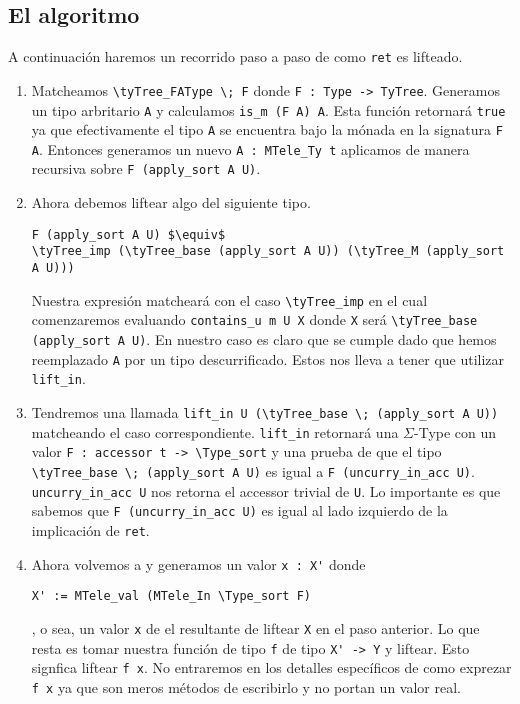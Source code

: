 \subsection{El algoritmo}

A continuación haremos un recorrido paso a paso de como \lstinline{ret} es lifteado.

\begin{enumerate}
    \item Matcheamos \lstinline{\tyTree_FAType \; F} donde \lstinline{F : Type -> TyTree}. Generamos un tipo arbritario \lstinline{A} y calculamos \lstinline{is_m (F A) A}. Esta función retornará \lstinline{true} ya que efectivamente el tipo \lstinline{A} se encuentra bajo la mónada en la signatura \lstinline{F A}. Entonces generamos un nuevo \lstinline{A : MTele_Ty t} aplicamos \lift de manera recursiva sobre \lstinline{F (apply_sort A U)}.
    \item Ahora debemos liftear algo del siguiente tipo.
    \begin{lstlisting}
F (apply_sort A U) $\equiv$
\tyTree_imp (\tyTree_base (apply_sort A U)) (\tyTree_M (apply_sort A U)))
    \end{lstlisting}
    Nuestra expresión matcheará con el caso \lstinline{\tyTree_imp} en el cual comenzaremos evaluando \lstinline{contains_u m U X} donde \lstinline{X} será \lstinline{\tyTree_base (apply_sort A U)}. En nuestro caso es claro que se cumple dado que hemos reemplazado \lstinline{A} por un tipo descurrificado. Estos nos lleva a tener que utilizar \lstinline{lift_in}.
    \item Tendremos una llamada \lstinline{lift_in U (\tyTree_base \; (apply_sort A U))} matcheando el caso correspondiente.
    \lstinline{lift_in} retornará una $\Sigma$-Type con un valor \lstinline{F : accessor t -> \Type_sort} y una prueba de que el tipo \lstinline{\tyTree_base \; (apply_sort A U)} es igual a \lstinline{F (uncurry_in_acc U)}. \lstinline{uncurry_in_acc U} nos retorna el accessor trivial de \lstinline{U}. Lo importante es que sabemos que \lstinline{F (uncurry_in_acc U)} es igual al lado izquierdo de la implicación de \lstinline{ret}.
    \item Ahora volvemos a \lift{} y generamos un valor \lstinline{x : X'} donde
    \begin{lstlisting}
X' := MTele_val (MTele_In \Type_sort F)
    \end{lstlisting}
    , o sea, un valor \lstinline{x} de el resultante de liftear \lstinline{X} en el paso anterior. Lo que resta es tomar nuestra función de tipo \lstinline{f} de tipo \lstinline{X' -> Y} y liftear. Esto signfica liftear \lstinline{f x}. No entraremos en los detalles específicos de como exprezar \lstinline{f x} ya que son meros métodos de escribirlo y no portan un valor real.
\end{enumerate}